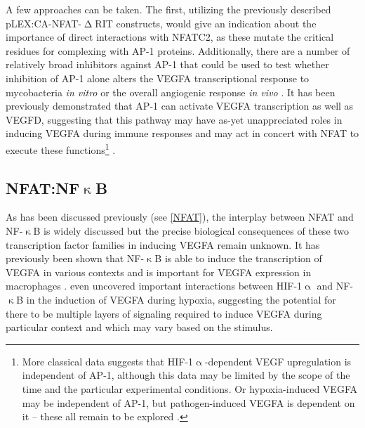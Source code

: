 A few approaches can be taken. The first, utilizing the previously described pLEX:CA\hyp{}NFAT\hyp{}$\upDelta$RIT constructs, would give an indication about the importance of direct interactions with NFATC2, as these mutate the critical residues for complexing with AP\hyp{}1 proteins. Additionally, there are a number of relatively broad inhibitors against AP\hyp{}1 that could be used to test whether inhibition of AP\hyp{}1 alone alters the VEGFA transcriptional response to mycobacteria \textit{in vitro} or the overall angiogenic response \textit{in vivo} \citep{Makino2017, Huang1997}. It has been previously demonstrated that AP\hyp{}1 can activate VEGFA transcription as well as VEGFD, suggesting that this pathway may have as\hyp{}yet unappreciated roles in inducing VEGFA during immune responses and may act in concert with NFAT to execute these functions\footnote{More classical data suggests that HIF\hyp{}1$\upalpha$\hyp{}dependent VEGF upregulation is independent of AP\hyp{}1, although this data may be limited by the scope of the time and the particular experimental conditions. Or hypoxia\hyp{}induced VEGFA may be independent of AP\hyp{}1, but pathogen\hyp{}induced VEGFA is dependent on it -- these all remain to be explored \citep{Finkenzeller1995}.} \citep{Shih2001, Debinski2001, Wang2016, Josko2004, Guo2022}.

\subsection{NFAT:NF$\upkappa$B}\label{nfatnfkb}

As has been discussed previously (see \autoref{NFAT}), the interplay between NFAT and NF\hyp{}$\upkappa$B is widely discussed but the precise biological consequences of these two transcription factor families in inducing VEGFA remain unknown. It has previously been shown that NF\hyp{}$\upkappa$B is able to induce the transcription of VEGFA in various contexts \citep{Xie2010, Greenberger2010, Lukiw2003} and is important for VEGFA expression in macrophages \citep{Kiriakidis2003}. \citet{Lukiw2003} even uncovered important interactions between HIF\hyp{}1$\upalpha$ and NF\hyp{}$\upkappa$B in the induction of VEGFA during hypoxia, suggesting the potential for there to be multiple layers of signaling required to induce VEGFA during particular context and which may vary based on the stimulus.

